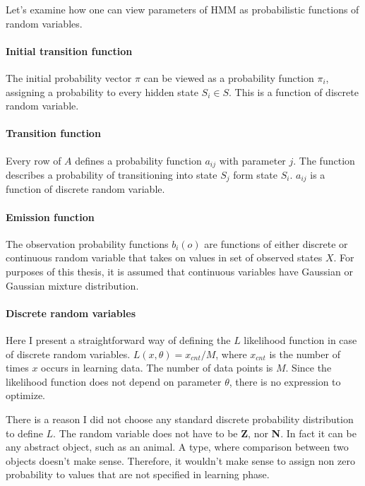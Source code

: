 \documentclass[thesis=B,english]{FITthesis}[2012/06/26]
\begin{document}
Let's examine how one can view parameters of HMM as probabilistic functions of random variables.

\paragraph{Initial transition function}

The initial probability vector $\pi$ can be viewed as a probability function $\pi_i$, assigning a probability to every hidden state $S_i \in S$. This is a function of discrete random variable.

\paragraph{Transition function}

Every row of $A$ defines a probability function $a_{ij}$ with parameter $j$. The function describes a probability of transitioning into state $S_j$ form state $S_i$. $a_{ij}$ is a function of discrete random variable.

\paragraph{Emission function}

The observation probability functions $b_i(o)$ are functions of either discrete or continuous random variable that takes on values in set of observed states $X$. For purposes of this thesis, it is assumed that continuous variables have Gaussian or Gaussian mixture distribution.

\paragraph{Discrete random variables}

Here I present a straightforward way of defining the $L$ likelihood function in case of discrete random variables. $L(x,\theta) = x_{cnt} / M$, where $x_{cnt}$ is the number of times $x$ occurs in learning data. The number of data points is $M$. Since the likelihood function does not depend on parameter $\theta$, there is no expression to optimize.

There is a reason I did not choose any standard discrete probability distribution to define $L$. The random variable does not have to be \textbf Z, nor \textbf N. In fact it can be any abstract object, such as an animal. A type, where comparison between two objects doesn't make sense. Therefore, it wouldn't make sense to assign non zero probability to values that are not specified in learning phase.
\end{document}

